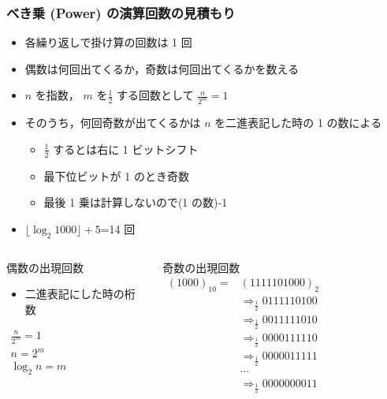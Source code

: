 \begin{frame}
\frametitle{べき乗 (Power) の演算回数の見積もり}
  \begin{itemize}
\scriptsize
\item 各繰り返しで掛け算の回数は 1 回
\item 偶数は何回出てくるか，奇数は何回出てくるかを数える
\item $n$ を指数， $m$ を\(\frac{1}{2}\) する回数として \(\frac{n}{2^m}=1\)
\item そのうち，何回奇数が出てくるかは $n$ を二進表記した時の 1 の数による
    \begin{itemize}
\scriptsize
\item \(\frac{1}{2}\) するとは右に 1 ビットシフト
\item 最下位ビットが 1 のとき奇数
\item 最後 1 乗は計算しないので(1 の数)-1
    \end{itemize}
\item \(\lfloor\log_2 1000\rfloor+5\)=14 回
  \end{itemize}
  \begin{columns}
    \begin{column}{0.45\textwidth}
      \begin{block}{偶数の出現回数}
        \begin{itemize}
\item 二進表記にした時の桁数
        \end{itemize}
        \begin{math}
          \begin{array}{c}
\frac{n}{2^m}=1\\
n=2^m\\
\log_2 n = m
          \end{array}
        \end{math}
      \end{block}
    \end{column}
    \begin{column}{0.5\textwidth}
      \begin{block}{奇数の出現回数}
\scriptsize
        \begin{math}
          \begin{array}{cl}
(1000)_{10}=&(1111101000)_{2}\\
&\Rightarrow_{\frac{1}{2}}0111110100\\
&\Rightarrow_{\frac{1}{2}}0011111010\\
&\Rightarrow_{\frac{1}{2}}0000111110\\
&\Rightarrow_{\frac{1}{2}}0000011111\\
&\cdots\\
&\Rightarrow_{\frac{1}{2}}0000000011
          \end{array}
        \end{math}
      \end{block}
    \end{column}
  \end{columns}
\end{frame}
